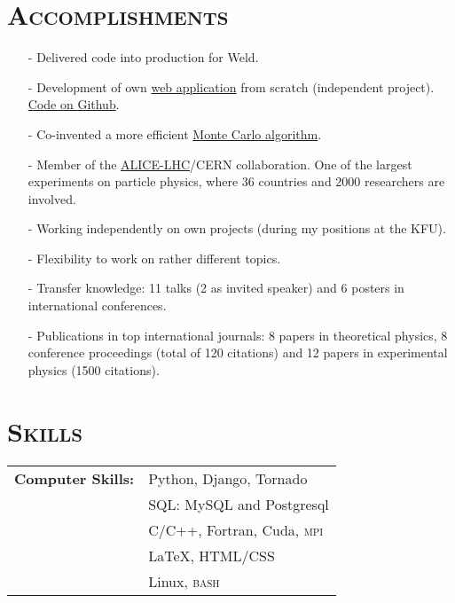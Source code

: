 \documentclass[a4paper, 10pt]{article}
\begin{document}
\vspace*{2mm}
\section{\textsc{Accomplishments}}
\vspace*{1mm}
\begin{itemize}
    \item[-] Delivered code into production for Weld.
    \item[-] Development of own \href{http://wines.e-cisac.com/start/}{web application} from scratch (independent project).  \href{https://github.com/ydelgadom/non_physics}{Code on Github}.\vspace{-1mm}
    \item[-] Co-invented a more efficient \href{http://inspirehep.net/record/1202877}{Monte Carlo algorithm}.
    \vspace{-1mm}
    \item[-] Member of the \href{http://home.web.cern.ch/about/experiments/alice}{ALICE-LHC}/CERN
    collaboration.  One of the largest experiments on particle physics, where 36 countries and 2000 researchers
    are involved.
    \vspace*{-1mm}
    \item[-] Working independently on own projects (during my positions at the KFU).
    \vspace*{-1mm}
    \item[-] Flexibility to work on rather different topics.
     \vspace*{-1mm}
    \item[-] Transfer knowledge: 11 talks (2 as invited speaker) 
    and 6 posters in international conferences.
     \vspace*{-1mm}
    \item[-] Publications in top international journals:
    8 papers in theoretical physics, 8 conference proceedings (total of 120 citations) and 
    12 papers in experimental physics (1500 citations).
\end{itemize}


\newpage
\section{\textsc{Skills}}
\vspace*{1mm}
\hspace*{-0.7cm}\begin{tabular}{ll}
{\bf Computer Skills:}
      & Python, Django, Tornado\vspace*{1mm}\\ 
      & SQL:  MySQL and Postgresql\vspace*{1mm}\\ 
      & C/C++, Fortran, Cuda, \textsc{mpi}\vspace*{1mm}\\
      & {\LaTeX}, HTML/CSS\vspace*{1mm}\\
      & Linux, \textsc{bash}\\
\end{tabular}\\[0.5pt]
\end{document}
